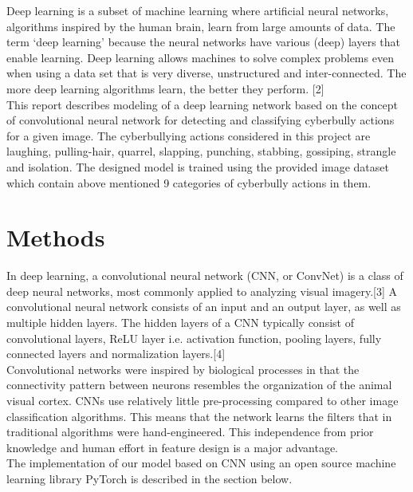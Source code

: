 \documentclass[12pt]{article}
\begin{document}
Deep learning is a subset of machine learning where artificial neural networks, algorithms inspired by the human brain, learn from large amounts of data. The term  ‘deep learning’ because the neural networks have various (deep) layers that enable learning. Deep learning allows machines to solve complex problems even when using a data set that is very diverse, unstructured and inter-connected. The more deep learning algorithms learn, the better they perform. [2] \\

This report describes modeling of a deep learning network based on the concept of convolutional neural network for detecting and classifying cyberbully actions for a given image. The cyberbullying actions considered in this project are laughing, pulling-hair, quarrel, slapping, punching, stabbing, gossiping, strangle and isolation. The designed model is trained using the provided image dataset which contain above mentioned 9 categories of cyberbully actions in them.   

\newpage

\section{Methods}
In deep learning, a convolutional neural network (CNN, or ConvNet) is a class of deep neural networks, most commonly applied to analyzing visual imagery.[3] A convolutional neural network consists of an input and an output layer, as well as multiple hidden layers. The hidden layers of a CNN typically consist of convolutional layers, ReLU layer i.e. activation function, pooling layers, fully connected layers and normalization layers.[4] \\ 

Convolutional networks were inspired by biological processes in that the connectivity pattern between neurons resembles the organization of the animal visual cortex. CNNs use relatively little pre-processing compared to other image classification algorithms. This means that the network learns the filters that in traditional algorithms were hand-engineered. This independence from prior knowledge and human effort in feature design is a major advantage. \\

The implementation of our model based on CNN using an open source machine learning library PyTorch is described in the section below. 
\end{document}
